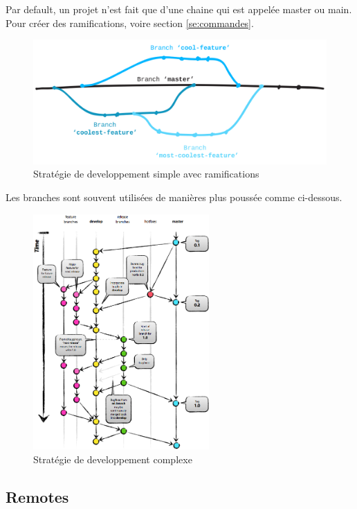 \documentclass[a4paper, 12pt]{article}
\begin{document}
    Par default, un projet n'est fait que d'une chaine qui est appelée master
    ou main. Pour créer des ramifications, voire section \ref{se:commandes}.

    \begin{figure}[H]
        \centering
        \includegraphics[scale=0.24]{figs/branches.png}
        \caption{Stratégie de developpement simple avec ramifications}
        \label{fig:branches}
    \end{figure}

    Les branches sont souvent utilisées de manières plus poussée comme
    ci-dessous.

    \begin{figure}[H]
        \centering
        \includegraphics[width=0.6\textwidth]{figs/branches_complicated.png}
        \caption{Stratégie de developpement complexe}
        \label{fig:branchescomp}
    \end{figure}
    
    \subsection{Remotes}
\end{document}
